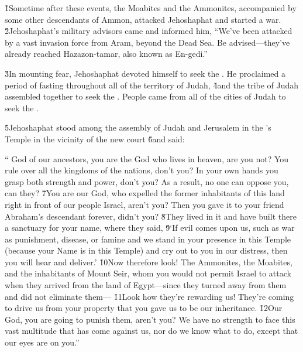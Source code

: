 \v{1}Sometime after these events, the Moabites and the Ammonites, accompanied by some other descendants of Ammon, attacked Jehoshaphat and started a war. \v{2}Jehoshaphat's military advisors came and informed him, ``We've been attacked by a vast invasion force from Aram, beyond the Dead Sea. Be advised---they've already reached Hazazon-tamar, also known as En-gedi.''

\v{3}In mounting fear, Jehoshaphat devoted himself to seek the . He proclaimed a period of fasting throughout all of the territory of Judah, \v{4}and the tribe of Judah assembled together to seek the . People came from all of the cities of Judah to seek the .

\v{5}Jehoshaphat stood among the assembly of Judah and Jerusalem in the 's Temple in the vicinity of the new court \v{6}and said:

\begin{poetry}
\poeml `` God of our ancestors, you are the God who lives in heaven, are you not? You rule over all the kingdoms of the nations, don't you? In your own hands you grasp both strength and power, don't you? As a result, no one can oppose you, can they? \v{7}You are our God, who expelled the former inhabitants of this land right in front of our people Israel, aren't you? Then you gave it to your friend Abraham's descendant forever, didn't you? \v{8}They lived in it and have built there a sanctuary for your name, where they said, \v{9}`If evil comes upon us, such as war as punishment, disease, or famine and we stand in your presence in this Temple (because your Name is in this Temple) and cry out to you in our distress, then you will hear and deliver.' \v{10}Now therefore look! The Ammonites, the Moabites, and the inhabitants of Mount Seir, whom you would not permit Israel to attack when they arrived from the land of Egypt---since they turned away from them and did not eliminate them--- \v{11}Look how they're rewarding us! They're coming to drive us from your property that you gave us to be our inheritance. \v{12}Our God, you are going to punish them, aren't you? We have no strength to face this vast multitude that has come against us, nor do we know what to do, except that our eyes are on you.''
\end{poetry}

